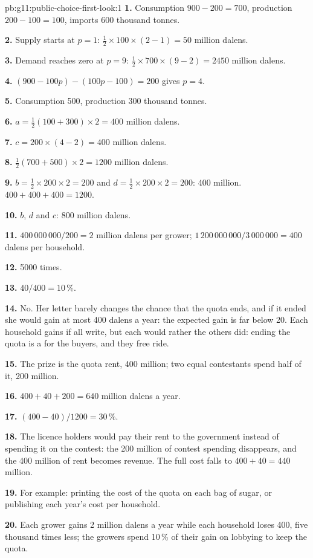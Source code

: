 \begin{solution}{pb:g11:public-choice-first-look:1}
\textbf{1.} Consumption $900 - 200 = 700$, production $200 - 100 = 100$, imports 600 thousand tonnes.

\textbf{2.} Supply starts at $p = 1$: $\tfrac12 \times 100 \times (2 - 1) = 50$ million dalens.

\textbf{3.} Demand reaches zero at $p = 9$: $\tfrac12 \times 700 \times (9 - 2) = 2450$ million dalens.

\textbf{4.} $(900 - 100p) - (100p - 100) = 200$ gives $p = 4$.

\textbf{5.} Consumption 500, production 300 thousand tonnes.

\textbf{6.} $a = \tfrac12(100 + 300) \times 2 = 400$ million dalens.

\textbf{7.} $c = 200 \times (4 - 2) = 400$ million dalens.

\textbf{8.} $\tfrac12(700 + 500) \times 2 = 1200$ million dalens.

\textbf{9.} $b = \tfrac12 \times 200 \times 2 = 200$ and $d = \tfrac12 \times 200 \times 2 = 200$: 400 million. $400 + 400 + 400 = 1200$.

\textbf{10.} $b$, $d$ and $c$: 800 million dalens.

\textbf{11.} $400\,000\,000/200 = 2$ million dalens per grower; $1\,200\,000\,000/3\,000\,000 = 400$ dalens per household.

\textbf{12.} 5000 times.

\textbf{13.} $40/400 = 10\,\%$.

\textbf{14.} No. Her letter barely changes the chance that the quota ends, and if it ended she would gain at most 400 dalens a year: the expected gain is far below 20. Each
household gains if all write, but each would rather the others did: ending the quota is a  for the buyers, and they free ride.

\textbf{15.} The prize is the quota rent, 400 million; two equal contestants spend half of it, 200 million.

\textbf{16.} $400 + 40 + 200 = 640$ million dalens a year.

\textbf{17.} $(400 - 40)/1200 = 30\,\%$.

\textbf{18.} The licence holders would pay their rent to the government instead of spending it on the contest: the 200 million of contest spending disappears, and the 400
million of rent becomes revenue. The full cost falls to $400 + 40 = 440$ million.

\textbf{19.} For example: printing the cost of the quota on each bag of sugar, or publishing each year's cost per household.

\textbf{20.} Each grower gains 2 million dalens a year while each household loses 400, five thousand times less; the growers spend 10\,\% of their gain on lobbying to keep
the quota.
\end{solution}

